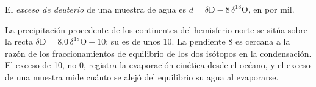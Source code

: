 \begin{definition}\label{def:b3:stable-isotopes:d-excess}
El \emph{exceso de deuterio} de una muestra de agua es $d =
\delta\mathrm D - 8\,\delta^{18}\mathrm O$, en por mil.
\end{definition}

La precipitación procedente de los continentes del hemisferio norte se sitúa sobre la recta
$\delta\mathrm D = 8.0\,\delta^{18}\mathrm O + 10$: su  es de unos
\qty{10}{\permil}. La pendiente 8 es cercana a la razón de los fraccionamientos de
equilibrio de los dos isótopos en la condensación. El exceso de 10, no 0,
registra la evaporación cinética desde el océano, y el exceso de una muestra
mide cuánto se alejó del equilibrio su agua al evaporarse.

